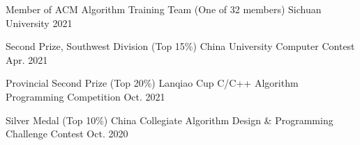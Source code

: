 

\begin{cvhonors}

  \cvhonor
    {Member of ACM Algorithm Training Team (One of 32 members)}
    {Sichuan University}
    {}
    {2021}

  \cvhonor
    {Second Prize, Southwest Division (Top 15\%)}
    {China University Computer Contest}
    {}
    {Apr. 2021}

  \cvhonor
    {Provincial Second Prize (Top 20\%)}
    {Lanqiao Cup C/C++ Algorithm Programming Competition}
    {}
    {Oct. 2021}


  \cvhonor
    {Silver Medal (Top 10\%)}
    {China Collegiate Algorithm Design \& Programming Challenge Contest}
    {}
    {Oct. 2020}

\end{cvhonors}
